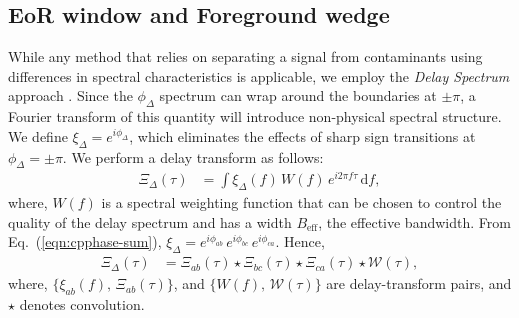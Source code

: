 \documentclass[
reprint,
superscriptaddress,
amsmath,
amssymb,
aps,
prd
]{revtex4-1}
\begin{document}
\subsection{EoR window and Foreground wedge}\label{sec:cp-FG-wedge}

While any method that relies on separating a signal from contaminants using differences in spectral characteristics is applicable, we employ the {\it Delay Spectrum} approach \cite{par12a,par12b}. Since the $\phi_\Delta$ spectrum can wrap around the boundaries at $\pm\pi$, a Fourier transform of this quantity will introduce non-physical spectral structure. We define $\xi_\Delta = e^{i\phi_\Delta}$, which eliminates the effects of sharp sign transitions at $\phi_\Delta=\pm\pi$. We perform a delay transform as follows:
\begin{align}\label{eqn:cpdspec}
  \Xi_\Delta(\tau) &= \int \xi_\Delta(f)\,W(f)\,e^{i2\pi f\tau}\,\mathrm{d}f,
\end{align}
where, $W(f)$ is a spectral weighting function that can be chosen to control the quality of the delay spectrum \citep{thy13,thy16} and has a width $B_\textrm{eff}$, the effective bandwidth. From Eq.~(\ref{eqn:cpphase-sum}), $\xi_\Delta = e^{i\phi_{ab}}\,e^{i\phi_{bc}}\,e^{i\phi_{ca}}$. Hence,
\begin{align}
  \Xi_\Delta(\tau) &= \Xi_{ab}(\tau) \star \Xi_{bc}(\tau) \star \Xi_{ca}(\tau) \star \mathcal{W}(\tau), \label{eqn:cpdspec-convolution}
\end{align}
where, $\{\xi_{ab}(f),\,\Xi_{ab}(\tau)\}$, and $\{W(f),\,\mathcal{W}(\tau)\}$ are delay-transform pairs, and $\star$ denotes convolution. 
\end{document}
